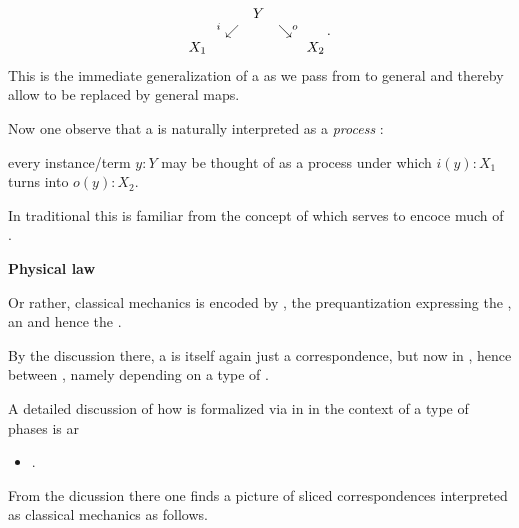 \documentclass[12pt,titlepage]{article}
\def\mathllap{\mathpalette\mathllapinternal}
\def\mathrlap{\mathpalette\mathrlapinternal}
\def\mathllapinternal#1#2{\llap{$\mathsurround=0pt#1{#2}$}}
\def\mathrlapinternal#1#2{\rlap{$\mathsurround=0pt#1{#2}$}}
\newcommand{\itexarray}[1]{\begin{matrix}#1\end{matrix}}
\theoremstyle{plain}
\theoremstyle{definition}
\theoremstyle{remark}
\begin{document}
\begin{displaymath}
\itexarray{
    && Y
    \\
    & {}^{\mathllap{i}}\swarrow && \searrow^{\mathrlap{o}}
    \\
    X_1 && && X_2
  }
  \,.
\end{displaymath}
This is the immediate generalization of a  as we pass from  to general  and thereby allow  to be replaced by general maps.

Now one observe that a  is naturally interpreted as a \emph{process} :

every instance/term $y\colon Y$ may be thought of as a process under which $i(y) \colon X_1$ turns into $o(y) \colon X_2$.

In traditional  this is familiar from the concept of  which serves to encoce much of .

\textbf{Physical law}

Or rather, classical mechanics is encoded by , the prequantization expressing the , an  and hence the .

By the discussion there, a  is itself again just a correspondence, but now in , hence between , namely depending on a type of .

A detailed discussion of how  is formalized via  in  in the context of a type of phases is ar

\begin{itemize}%
\item {}.

\end{itemize}
From the dicussion there one finds a picture of sliced correspondences interpreted as classical mechanics as follows.
\end{document}
